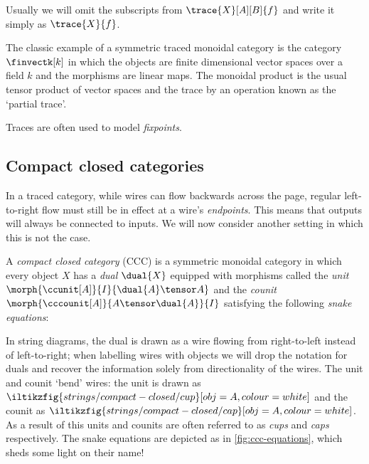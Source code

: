 Usually we will omit the subscripts from \(\trace{X}[A][B]{f}\) and write it
simply as \(\trace{X}{f}\).



\begin{example}
    The classic example of a symmetric traced monoidal category is the category
    \(\finvectk[k]\) in which the objects are finite dimensional vector spaces
    over a field \(k\) and the morphisms are linear maps.
    The monoidal product is the usual tensor product of vector spaces and the
    trace by an operation known as the `partial trace'.
\end{example}

Traces are often used to model \emph{fixpoints}.


\subsection{Compact closed categories}

In a traced category, while wires can flow backwards across the page, regular
left-to-right flow must still be in effect at a wire's \emph{endpoints}.
This means that outputs will always be connected to inputs.
We will now consider another setting in which this is not the case.

\begin{definition}
    A \emph{compact closed category} (CCC) is a symmetric monoidal category in
    which every object \(X\) has a \emph{dual} \(\dual{X}\) equipped with
    morphisms called the \emph{unit} \(
        \morph{\ccunit[A]}{I}{\dual{A} \tensor A}
    \) and the \emph{counit} \(
        \morph{\cccounit[A]}{A \tensor \dual{A}}{I}
    \) satisfying the following \emph{snake equations}:
    \begin{center}
        
        \quad
        
    \end{center}
\end{definition}

In string diagrams, the dual is drawn as a wire flowing from right-to-left
instead of left-to-right; when labelling wires with objects we will drop the
notation for duals and recover the information solely from directionality of the
wires.
The unit and counit `bend' wires: the unit is drawn as \(
    \iltikzfig{strings/compact-closed/cup}[obj=A,colour=white]
\) and the counit as \(
    \iltikzfig{strings/compact-closed/cap}[obj=A,colour=white]
\).
As a result of this units and counits are often referred to as \emph{cups} and
\emph{caps} respectively.
The snake equations are depicted as in \cref{fig:ccc-equations}, which
sheds some light on their name!

